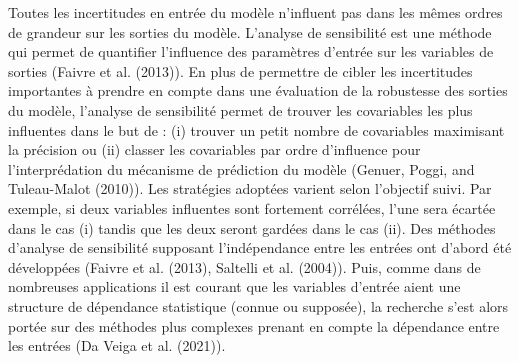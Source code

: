 \documentclass[
]{article}
\begin{document}
Toutes les incertitudes en entrée du modèle n'influent pas dans les
mêmes ordres de grandeur sur les sorties du modèle. L'analyse de
sensibilité est une méthode qui permet de quantifier l'influence des
paramètres d'entrée sur les variables de sorties (Faivre et al. (2013)).
En plus de permettre de cibler les incertitudes importantes à prendre en
compte dans une évaluation de la robustesse des sorties du modèle,
l'analyse de sensibilité permet de trouver les covariables les plus
influentes dans le but de : (i) trouver un petit nombre de covariables
maximisant la précision ou (ii) classer les covariables par ordre
d'influence pour l'interprédation du mécanisme de prédiction du modèle
(Genuer, Poggi, and Tuleau-Malot (2010)). Les stratégies adoptées
varient selon l'objectif suivi. Par exemple, si deux variables
influentes sont fortement corrélées, l'une sera écartée dans le cas (i)
tandis que les deux seront gardées dans le cas (ii). Des méthodes
d'analyse de sensibilité supposant l'indépendance entre les entrées ont
d'abord été développées (Faivre et al. (2013), Saltelli et al. (2004)).
Puis, comme dans de nombreuses applications il est courant que les
variables d'entrée aient une structure de dépendance statistique (connue
ou supposée), la recherche s'est alors portée sur des méthodes plus
complexes prenant en compte la dépendance entre les entrées (Da Veiga et
al. (2021)).
\end{document}
